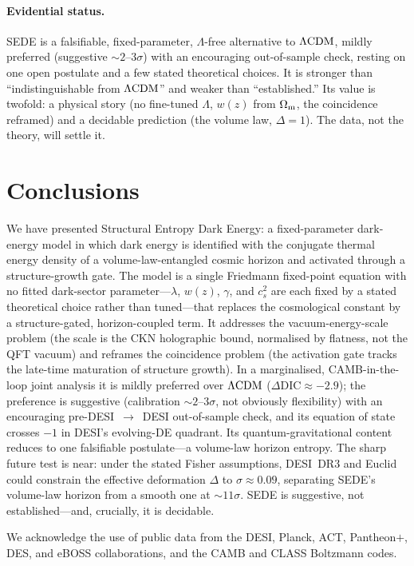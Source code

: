 \paragraph{Evidential status.} SEDE is a falsifiable, fixed-parameter, $\Lambda$-free alternative to
$\Lambda\mathrm{CDM}$, mildly preferred (suggestive $\sim2$--$3\sigma$) with an encouraging out-of-sample check,
resting on one open postulate and a few stated theoretical choices. It is stronger than
``indistinguishable from $\Lambda\mathrm{CDM}$'' and weaker than ``established.'' Its value is twofold: a physical
story (no fine-tuned $\Lambda$, $w(z)$ from $\Omega_{\mathrm m}$, the coincidence reframed) and a decidable prediction
(the volume law, $\Delta=1$). The data, not the theory, will settle it.

\section{Conclusions}\label{sec:concl}
We have presented Structural Entropy Dark Energy: a fixed-parameter dark-energy model in which dark
energy is identified with the conjugate thermal energy density of a volume-law-entangled cosmic horizon
and activated through a structure-growth gate. The model is a single Friedmann fixed-point equation with
no fitted dark-sector parameter---$\lambda$, $w(z)$, $\gamma$, and $c_s^2$ are each fixed by a stated
theoretical choice rather than tuned---that replaces the cosmological constant by a structure-gated,
horizon-coupled term. It addresses the vacuum-energy-scale problem (the scale is the CKN holographic
bound, normalised by flatness, not the QFT vacuum) and reframes the coincidence problem (the activation
gate tracks the late-time maturation of structure growth). In a marginalised, CAMB-in-the-loop joint
analysis it is mildly preferred over $\Lambda\mathrm{CDM}$ ($\Delta\mathrm{DIC}\approx-2.9$); the preference is
suggestive (calibration $\sim2$--$3\sigma$, not obviously flexibility) with an encouraging
pre-DESI~$\to$~DESI out-of-sample check, and its equation of state crosses $-1$ in DESI's evolving-DE
quadrant. Its quantum-gravitational content reduces to one falsifiable postulate---a volume-law horizon
entropy. The sharp future test is near: under the stated Fisher assumptions, DESI~DR3 and Euclid could
constrain the effective deformation $\Delta$ to $\sigma\approx0.09$, separating SEDE's volume-law
horizon from a smooth one at $\sim11\sigma$. SEDE is suggestive, not established---and, crucially, it is
decidable.

\begin{acknowledgments}
We acknowledge the use of public data from the DESI, Planck, ACT, Pantheon$+$, DES, and eBOSS
collaborations, and the CAMB and CLASS Boltzmann codes.
\end{acknowledgments}


